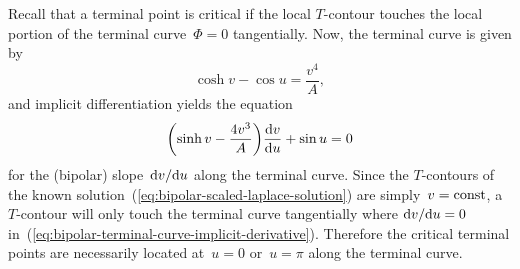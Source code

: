 Recall that a terminal point is critical
if the local $T$-contour touches
the local portion of the terminal curve~$\Phi = 0$ tangentially.
Now, the terminal curve is given by
\begin{equation}
  \cosh v - \cos u = \frac{v^4}{A},
  \label{eq:bipolar-terminal-curve}
\end{equation}
and implicit differentiation yields the equation
\begin{equation}
  \roundbr*{\sinh v - \frac{4 v^3}{A}} \tder{v}{u} + \sin u = 0
  \label{eq:bipolar-terminal-curve-implicit-derivative}
\end{equation}
for the (bipolar) slope~$\mathop{}\!\mathrm{d} v / {\mathop{}\!\mathrm{d} u}$
along the terminal curve.
Since the $T$-contours
of the known solution~(\ref{eq:bipolar-scaled-laplace-solution})
are simply~$v = \mathrm{const}$,
a $T$-contour will only touch the terminal curve tangentially
where $\mathop{}\!\mathrm{d} v / {\mathop{}\!\mathrm{d} u} = 0$
in~(\ref{eq:bipolar-terminal-curve-implicit-derivative}).
Therefore the critical terminal points are necessarily located
at~$u = 0$ or~$u = \pi$ along the terminal curve.
